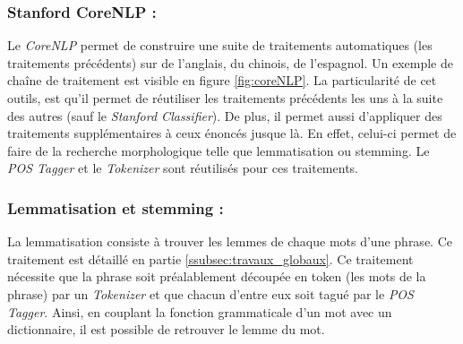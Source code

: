            \subsubsection{Stanford CoreNLP :}
                Le \textit{CoreNLP} permet de construire une suite de traitements automatiques (les traitements précédents) sur de l'anglais, du chinois, de l'espagnol. Un exemple de chaîne de traitement est visible en figure \ref{fig:coreNLP}. La particularité de cet outils, est qu'il permet de réutiliser les traitements précédents les uns à la suite des autres (sauf le \textit{Stanford Classifier}). De plus, il permet aussi d'appliquer des traitements supplémentaires à ceux énoncés jusque là. En effet, celui-ci permet de faire de la recherche morphologique telle que lemmatisation ou stemming. Le \textit{POS Tagger} et le \textit{Tokenizer} sont réutilisés pour ces traitements.


            \subsubsection{Lemmatisation et stemming :}
                La lemmatisation consiste à trouver les lemmes de chaque mots d'une phrase. Ce traitement est détaillé en partie \ref{ssubsec:travaux_globaux}. Ce traitement nécessite que la phrase soit préalablement découpée en token (les mots de la phrase) par un \textit{Tokenizer} et que chacun d'entre eux soit tagué par le \textit{POS Tagger}. Ainsi, en couplant la fonction grammaticale d'un mot avec un dictionnaire, il est possible de retrouver le lemme du mot.

